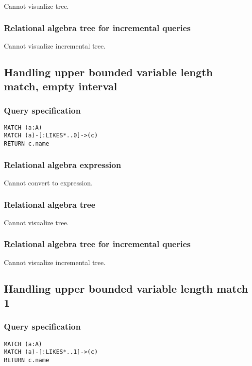 Cannot visualize tree.

\subsubsection*{Relational algebra tree for incremental queries}

Cannot visualize incremental tree.

\subsection{Handling upper bounded variable length match, empty interval}

\subsubsection*{Query specification}

\begin{lstlisting}
MATCH (a:A)
MATCH (a)-[:LIKES*..0]->(c)
RETURN c.name
\end{lstlisting}

\subsubsection*{Relational algebra expression}

Cannot convert to expression.

\subsubsection*{Relational algebra tree}

Cannot visualize tree.

\subsubsection*{Relational algebra tree for incremental queries}

Cannot visualize incremental tree.

\subsection{Handling upper bounded variable length match 1}

\subsubsection*{Query specification}

\begin{lstlisting}
MATCH (a:A)
MATCH (a)-[:LIKES*..1]->(c)
RETURN c.name
\end{lstlisting}

